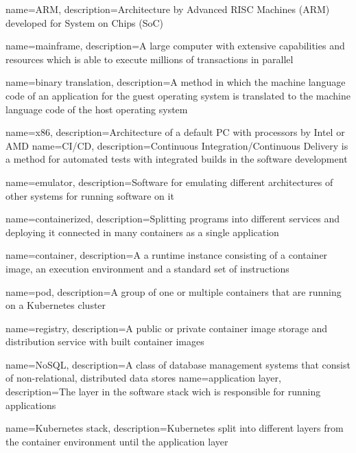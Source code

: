 {
    name={ARM},
    description={Architecture by Advanced RISC Machines (ARM) developed for System on Chips (SoC)}
}

{
    name={mainframe},
    description={A large computer with extensive capabilities and resources which is able to execute millions of transactions in parallel}
}

{
    name={binary translation},
    description={A method in which the machine language code of an application for the guest operating system is translated to the machine language code of the host operating system}
}

{
    name={x86},
    description={Architecture of a default PC with processors by Intel or AMD}
}
{
    name={CI/CD},
    description={Continuous Integration/Continuous Delivery is a method for automated tests with integrated builds in the software development}
}

{
    name={emulator},
    description={Software for emulating different architectures of other systems for running software on it}
}

{
    name={containerized},
    description={Splitting programs into different services and deploying it connected in many containers as a single application}
}

{
    name={container},
    description={A a runtime instance consisting of a container image, an execution environment and a standard set of instructions}
}

{
    name={pod},
    description={A group of one or multiple containers that are running on a Kubernetes cluster}
}

{
    name={registry},
    description={A public or private container image storage and distribution service with built container images}
}

{
    name={NoSQL},
    description={A class of database management systems that consist of non-relational, distributed data stores}
}
{
    name={application layer},
    description={The layer in the software stack wich is responsible for running applications}
}

{
    name={Kubernetes stack},
    description={Kubernetes split into different layers from the container environment until the application layer}
}

